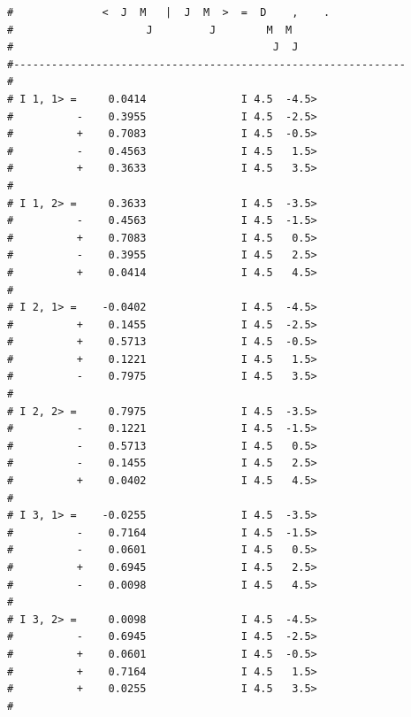 \begin{enumerate}
{\begin{verbatim}
#              <  J  M   |  J  M  >  =  D    ,    .            
#                     J         J        M  M                  
#                                         J  J                 
#--------------------------------------------------------------
#                                                              
# I 1, 1> =     0.0414               I 4.5  -4.5>              
#          -    0.3955               I 4.5  -2.5>              
#          +    0.7083               I 4.5  -0.5>              
#          -    0.4563               I 4.5   1.5>              
#          +    0.3633               I 4.5   3.5>              
#                                                              
# I 1, 2> =     0.3633               I 4.5  -3.5>              
#          -    0.4563               I 4.5  -1.5>              
#          +    0.7083               I 4.5   0.5>              
#          -    0.3955               I 4.5   2.5>              
#          +    0.0414               I 4.5   4.5>              
#                                                              
# I 2, 1> =    -0.0402               I 4.5  -4.5>              
#          +    0.1455               I 4.5  -2.5>              
#          +    0.5713               I 4.5  -0.5>              
#          +    0.1221               I 4.5   1.5>              
#          -    0.7975               I 4.5   3.5>              
#                                                              
# I 2, 2> =     0.7975               I 4.5  -3.5>              
#          -    0.1221               I 4.5  -1.5>              
#          -    0.5713               I 4.5   0.5>              
#          -    0.1455               I 4.5   2.5>              
#          +    0.0402               I 4.5   4.5>              
#                                                              
# I 3, 1> =    -0.0255               I 4.5  -3.5>              
#          -    0.7164               I 4.5  -1.5>              
#          -    0.0601               I 4.5   0.5>              
#          +    0.6945               I 4.5   2.5>              
#          -    0.0098               I 4.5   4.5>              
#                                                              
# I 3, 2> =     0.0098               I 4.5  -4.5>              
#          -    0.6945               I 4.5  -2.5>              
#          +    0.0601               I 4.5  -0.5>              
#          +    0.7164               I 4.5   1.5>              
#          +    0.0255               I 4.5   3.5>              
#                                                              

\end{verbatim}}
\end{enumerate}
